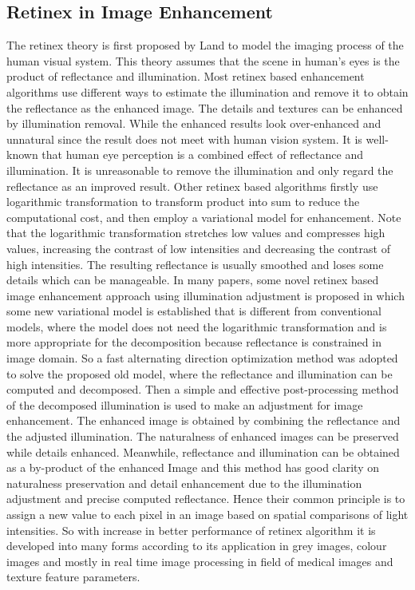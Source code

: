\subsection{Retinex in Image Enhancement}
The retinex theory is first proposed by Land to model the imaging process of the human visual system. This theory assumes that the scene in human’s eyes is the product of reflectance and illumination\cite{ill1}. Most retinex based enhancement algorithms use different ways to estimate the illumination and remove it to obtain the reflectance as the enhanced image. The details and textures can be enhanced by illumination removal\cite{ill2}. While the enhanced results look over-enhanced and unnatural since the result does not meet with human vision system. It is well-known that human eye perception is a combined effect of reflectance and illumination\cite{ill3}. It is unreasonable to remove the illumination and only regard the reflectance as an improved result. Other retinex based algorithms firstly use logarithmic transformation to transform product into sum to reduce the computational cost, and then employ a variational model for enhancement\cite{ie1}. Note that the logarithmic transformation stretches low values and compresses high values, increasing the contrast of low intensities and decreasing the contrast of high intensities. The resulting reflectance is usually smoothed and loses some details which can be manageable. In many papers, some novel retinex based image enhancement approach using illumination adjustment is proposed in which some new variational model is established that is different from conventional models, where the model does not need the logarithmic transformation and is more appropriate for the decomposition because reflectance is constrained in image domain. So a fast alternating direction optimization method was adopted to solve the proposed old model, where the reflectance and illumination can be computed and decomposed\cite{ill2}. Then a simple and effective post-processing method of the decomposed illumination is used to make an adjustment for image enhancement. The enhanced image is obtained by combining the reflectance and the adjusted illumination. The naturalness of enhanced images can be preserved while details enhanced. Meanwhile, reflectance and illumination can be obtained as a by-product of the enhanced Image and this method has good clarity on naturalness preservation and detail enhancement due to the illumination adjustment and precise computed reflectance. Hence their common principle is to assign a new value to each pixel in an image based on spatial comparisons of light intensities. So with increase in better performance of retinex algorithm it is developed into many forms according to its application in grey images, colour images and mostly in real time image processing in field of medical images and texture feature parameters\cite{ie1}.


